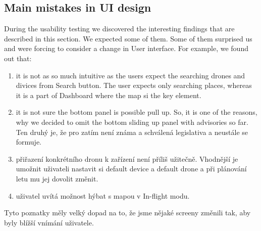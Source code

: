 \subsection{Main mistakes in UI design}\label{subsec:main-mistakes-in-ui-design}
During the usability testing we discovered the interesting findings that are described in this section.
We expected some of them.
Some of them surprised us and were forcing to consider a change in User interface.
For example, we found out that:
\begin{enumerate} %
    \item it is not as so much intuitive as the users expect the searching drones and divices from Search button.
    The user expects only searching places, whereas it is a part of Dashboard where the map si the key element.
    \item it is not sure the bottom panel is possible pull up.
    So, it is one of the reasons, why we decided to omit the bottom sliding up panel with advisories so far.
    Ten druhý je, že pro zatím není známa a schválená legislativa a neustále se formuje.
    \item přiřazení konkrétního dronu k zařízení není příliš užitečně.
    Vhodnější je umožnit uživateli nastavit si default device a default drone a při plánování letu mu jej dovolit změnit.
    \item uživatel uvítá možnost hýbat s mapou v In-flight modu.
\end{enumerate}
Tyto poznatky měly velký dopad na to, že jsme nějaké screeny změnili tak, aby byly blížší vnímání uživatele.
